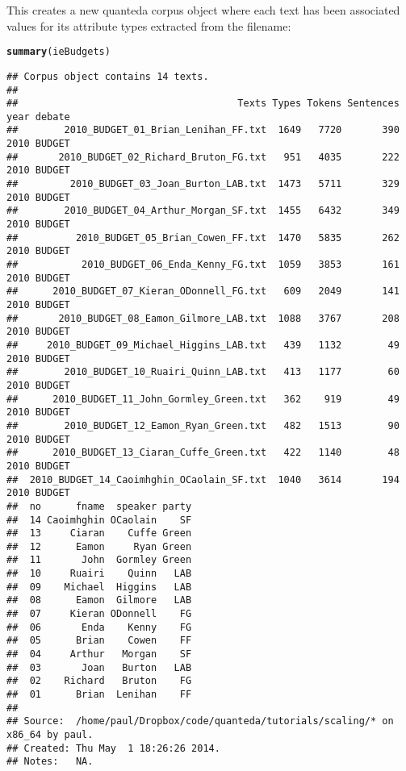 \documentclass{article}\usepackage[]{graphicx}\usepackage[]{color}
\makeatletter
\newcommand{\hlstd}[1]{\textcolor[rgb]{0.345,0.345,0.345}{#1}}%
\newcommand{\hlkwd}[1]{\textcolor[rgb]{0.737,0.353,0.396}{\textbf{#1}}}%
\newenvironment{kframe}{%
 \def\at@end@of@kframe{}%
 \ifinner\ifhmode%
  \def\at@end@of@kframe{\end{minipage}}%
  \begin{minipage}{\columnwidth}%
 \fi\fi%
 \def\FrameCommand##1{\hskip\@totalleftmargin \hskip-\fboxsep
 \colorbox{shadecolor}{##1}\hskip-\fboxsep
     \hskip-\linewidth \hskip-\@totalleftmargin \hskip\columnwidth}%
 \MakeFramed {\advance\hsize-\width
   \@totalleftmargin\z@ \linewidth\hsize
   \@setminipage}}%
 {\par\unskip\endMakeFramed%
 \at@end@of@kframe}
\newenvironment{knitrout}{}{} %
\makeatother
\begin{document}
This creates a new quanteda corpus object where each text has been associated values for its attribute types extracted from the filename:

\begin{knitrout}
\color{fgcolor}\begin{kframe}
\begin{alltt}
\hlkwd{summary}\hlstd{(ieBudgets)}
\end{alltt}
\begin{verbatim}
## Corpus object contains 14 texts.
## 
##                                      Texts Types Tokens Sentences year debate
##        2010_BUDGET_01_Brian_Lenihan_FF.txt  1649   7720       390 2010 BUDGET
##       2010_BUDGET_02_Richard_Bruton_FG.txt   951   4035       222 2010 BUDGET
##         2010_BUDGET_03_Joan_Burton_LAB.txt  1473   5711       329 2010 BUDGET
##        2010_BUDGET_04_Arthur_Morgan_SF.txt  1455   6432       349 2010 BUDGET
##          2010_BUDGET_05_Brian_Cowen_FF.txt  1470   5835       262 2010 BUDGET
##           2010_BUDGET_06_Enda_Kenny_FG.txt  1059   3853       161 2010 BUDGET
##      2010_BUDGET_07_Kieran_ODonnell_FG.txt   609   2049       141 2010 BUDGET
##       2010_BUDGET_08_Eamon_Gilmore_LAB.txt  1088   3767       208 2010 BUDGET
##     2010_BUDGET_09_Michael_Higgins_LAB.txt   439   1132        49 2010 BUDGET
##        2010_BUDGET_10_Ruairi_Quinn_LAB.txt   413   1177        60 2010 BUDGET
##      2010_BUDGET_11_John_Gormley_Green.txt   362    919        49 2010 BUDGET
##        2010_BUDGET_12_Eamon_Ryan_Green.txt   482   1513        90 2010 BUDGET
##      2010_BUDGET_13_Ciaran_Cuffe_Green.txt   422   1140        48 2010 BUDGET
##  2010_BUDGET_14_Caoimhghin_OCaolain_SF.txt  1040   3614       194 2010 BUDGET
##  no      fname  speaker party
##  14 Caoimhghin OCaolain    SF
##  13     Ciaran    Cuffe Green
##  12      Eamon     Ryan Green
##  11       John  Gormley Green
##  10     Ruairi    Quinn   LAB
##  09    Michael  Higgins   LAB
##  08      Eamon  Gilmore   LAB
##  07     Kieran ODonnell    FG
##  06       Enda    Kenny    FG
##  05      Brian    Cowen    FF
##  04     Arthur   Morgan    SF
##  03       Joan   Burton   LAB
##  02    Richard   Bruton    FG
##  01      Brian  Lenihan    FF
## 
## Source:  /home/paul/Dropbox/code/quanteda/tutorials/scaling/* on x86_64 by paul.
## Created: Thu May  1 18:26:26 2014.
## Notes:   NA.
\end{verbatim}
\end{kframe}
\end{knitrout}
\end{document}
